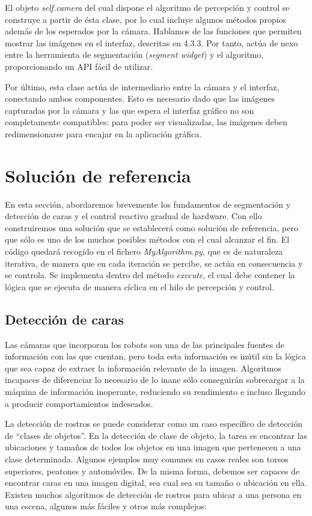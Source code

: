 El objeto \textit{self.camera} del cual dispone el algoritmo de percepción y control se construye a partir de ésta clase, por lo cual incluye algunos métodos propios además de los esperados por la cámara. Hablamos de las funciones que permiten mostrar las imágenes en el interfaz, descritas en 4.3.3. Por tanto, actúa de nexo entre la herramienta de segmentación (\textit{segment widget}) y el algoritmo, proporcionando un API fácil de utilizar.

Por último, esta clase actúa de intermediario entre la cámara y el interfaz, conectando ambos componentes. Esto es necesario dado que las imágenes capturadas por la cámara y las que espera el interfaz gráfico no son completamente compatibles: para poder ser visualizadas, las imágenes deben redimensionarse para encajar en la aplicación gráfica.

\section{Solución de referencia}
En esta sección, abordaremos brevemente los fundamentos de segmentación y detección de caras y el control reactivo gradual de hardware. Con ello construiremos una solución que se establecerá como solución de referencia, pero que sólo es uno de los muchos posibles métodos con el cual alcanzar el fin. El código quedará recogido en el fichero \textit{MyAlgorithm.py}, que es de naturaleza iterativa, de manera que en cada iteración se percibe, se actúa en consecuencia y se controla. Se implementa dentro del método \textit{execute}, el cual debe contener la lógica que se ejecuta de manera cíclica en el hilo de percepción y control.

\subsection{Detección de caras}
Las cámaras que incorporan los robots son una de las principales fuentes de información con las que cuentan, pero toda esta información es inútil sin la lógica que sea capaz de extraer la información relevante de la imagen. Algoritmos incapaces de diferenciar lo necesario de lo inane sólo conseguirán sobrecargar a la máquina de información inoperante, reduciendo su rendimiento e incluso llegando a producir comportamientos indeseados.

La detección de rostros se puede considerar como un caso específico de detección de “clases de objetos”. En la detección de clase de objeto, la tarea es encontrar las ubicaciones y tamaños de todos los objetos en una imagen que pertenecen a una clase determinada. Algunos ejemplos muy comunes en casos reales son torsos superiores, peatones y automóviles. De la misma forma, debemos ser capaces de encontrar caras en una imagen digital, sea cual sea su tamaño o ubicación en ella. Existen muchos algoritmos de detección de rostros para ubicar a una persona en una escena, algunos más fáciles y otros más complejos:

